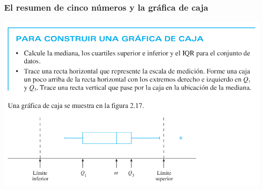 \documentclass[spanish]{beamer}
\begin{document}
\begin{frame}
\frametitle{El resumen de cinco números y la gráfica de caja}


\begin{center}
\includegraphics[width=\textwidth]{im30}
\end{center}

\end{frame}
\end{document}
